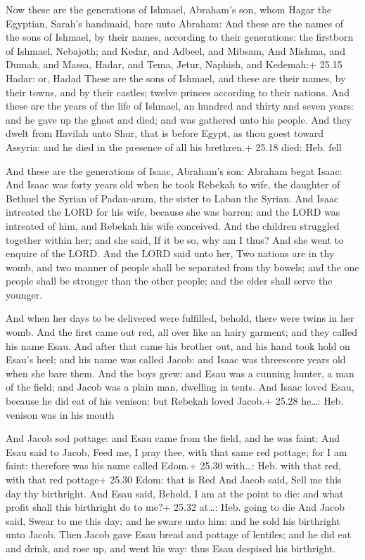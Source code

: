  Now these are the generations of Ishmael, Abraham's son,
whom Hagar the Egyptian, Sarah's handmaid, bare unto Abraham:
 And these are the names of the sons of Ishmael, by their
names, according to their generations: the firstborn of Ishmael,
Nebajoth; and Kedar, and Adbeel, and Mibsam,  And Mishma,
and Dumah, and Massa,  Hadar, and Tema, Jetur, Naphish, and
Kedemah:+ 25.15 Hadar: or, Hadad  These are the sons of
Ishmael, and these are their names, by their towns, and by their
castles; twelve princes according to their nations.  And
these are the years of the life of Ishmael, an hundred and thirty and
seven years: and he gave up the ghost and died; and was gathered unto
his people.  And they dwelt from Havilah unto Shur, that is
before Egypt, as thou goest toward Assyria: and he died in the presence
of all his brethren.+ 25.18 died: Heb. fell

 And these are the generations of Isaac, Abraham's son:
Abraham begat Isaac:  And Isaac was forty years old when he
took Rebekah to wife, the daughter of Bethuel the Syrian of Padan-aram,
the sister to Laban the Syrian.  And Isaac intreated the
LORD for his wife, because she was barren: and the LORD was intreated of
him, and Rebekah his wife conceived.  And the children
struggled together within her; and she said, If it be so, why am I thus?
And she went to enquire of the LORD.  And the LORD said
unto her, Two nations are in thy womb, and two manner of people shall be
separated from thy bowels; and the one people shall be stronger than the
other people; and the elder shall serve the younger.

 And when her days to be delivered were fulfilled,
behold, there were twins in her womb.  And the first came
out red, all over like an hairy garment; and they called his name Esau.
 And after that came his brother out, and his hand took
hold on Esau's heel; and his name was called Jacob: and Isaac was
threescore years old when she bare them.  And the boys
grew: and Esau was a cunning hunter, a man of the field; and Jacob was a
plain man, dwelling in tents.  And Isaac loved Esau,
because he did eat of his venison: but Rebekah loved Jacob.+ 25.28
he\ldots: Heb. venison was in his mouth

 And Jacob sod pottage: and Esau came from the field, and
he was faint:  And Esau said to Jacob, Feed me, I pray
thee, with that same red pottage; for I am faint: therefore was his name
called Edom.+ 25.30 with\ldots: Heb. with that red, with that red
pottage+ 25.30 Edom: that is Red  And Jacob said, Sell me
this day thy birthright.  And Esau said, Behold, I am at
the point to die: and what profit shall this birthright do to me?+ 25.32
at\ldots: Heb. going to die  And Jacob said, Swear to me
this day; and he sware unto him: and he sold his birthright unto Jacob.
 Then Jacob gave Esau bread and pottage of lentiles; and he
did eat and drink, and rose up, and went his way: thus Esau despised his
birthright.

